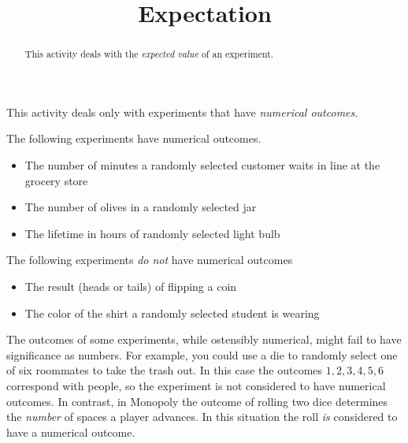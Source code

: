 \documentclass{ximera}
\title{Expectation}
\begin{document}
\begin{abstract}
This activity deals with the {\em expected value}
of an experiment.
\end{abstract}
\maketitle

This activity deals only with experiments
that have {\em numerical outcomes}.

\begin{example}
The following experiments have numerical outcomes.
\begin{itemize}
\item The number of minutes a randomly selected
customer waits in line at the grocery store
\item The number of olives in a randomly selected jar
\item The lifetime in hours of randomly selected light bulb
\end{itemize}
\end{example}

\begin{example}
The following experiments {\em do not} have numerical outcomes
\begin{itemize}
\item The result (heads or tails) of flipping a coin
\item The color of the shirt a randomly selected student is wearing
\end{itemize}
\end{example}

\begin{remark}
The outcomes of some experiments, while ostensibly numerical,
might fail to have significance as numbers.
For example, you could use a die to randomly select one of
six roommates to take the trash out.
In this case the outcomes $1,2,3,4,5,6$ correspond with people,
so the experiment is not considered to have numerical outcomes.
In contrast, in Monopoly the outcome of rolling two dice
determines the {\em number} of spaces a player advances.
In this situation the roll {\em is} considered to have a numerical outcome.
\end{remark}
\end{document}
